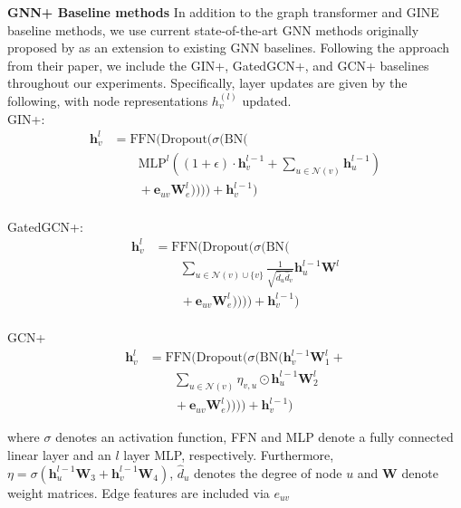 \textbf{GNN+ Baseline methods}
In addition to the graph transformer and GINE baseline methods, we use current state-of-the-art GNN methods originally proposed by \citet{LuoEtAl25} as an extension to existing GNN baselines. Following the approach from their paper, we include the GIN+, GatedGCN+, and GCN+ baselines throughout our experiments. Specifically, layer updates are given by the following, with node representations $h_v^{(l)}$ updated. \\
GIN+:
\begin{equation*}
  \begin{aligned}
    \boldsymbol{h}_v^l &= \text{FFN}(\text{Dropout}(\sigma(\text{BN}( \\
 &\qquad \text{MLP}^l((1 + \epsilon) \cdot \boldsymbol{h}_v^{l-1} + \sum_{u \in \mathcal{N}(v)} \boldsymbol{h}_u^{l-1}) \\
 &\qquad + \boldsymbol{e}_{uv} \boldsymbol{W}_e^l)))) + \boldsymbol{h}_v^{l-1})
  \end{aligned}
\end{equation*} \\
GatedGCN+:
\begin{equation*}
  \begin{aligned}
    \boldsymbol{h}_v^l &= \text{FFN}(\text{Dropout}(\sigma(\text{BN}(\\
 &\qquad \sum_{u \in \mathcal{N}(v) \cup \{v\}} \frac{1}{\sqrt{\hat{d}_u \hat{d}_v}} \boldsymbol{h}_u^{l-1} \boldsymbol{W}^l \\
 &\qquad + \boldsymbol{e}_{uv} \boldsymbol{W}_e^l)))) + \boldsymbol{h}_v^{l-1})
  \end{aligned}
\end{equation*} \\
GCN+
\begin{equation*}
  \begin{aligned}
    \boldsymbol{h}_v^l &= \text{FFN}(\text{Dropout}(\sigma(\text{BN}( \boldsymbol{h}_v^{l-1}\boldsymbol{W}_1^l + \\
 &\qquad \sum_{u \in \mathcal{N}(v)} \eta_{v,u} \odot \boldsymbol{h}_u^{l-1} \boldsymbol{W}_2^l \\
 &\qquad + \boldsymbol{e}_{uv} \boldsymbol{W}_e^l)))) + \boldsymbol{h}_v^{l-1})
  \end{aligned}
\end{equation*}

where $\sigma$ denotes an activation function, FFN and MLP denote a fully connected linear layer and an $l$ layer MLP, respectively. Furthermore, $\eta= \sigma(\boldsymbol{h}_{u}^{l-1}\boldsymbol{W}_3 + \boldsymbol{h}_{v}^{l-1}\boldsymbol{W}_4)$, $\hat{d}_u$ denotes the degree of node $u$ and $\boldsymbol{W}$ denote weight matrices. Edge features are included via $e_{uv}$

